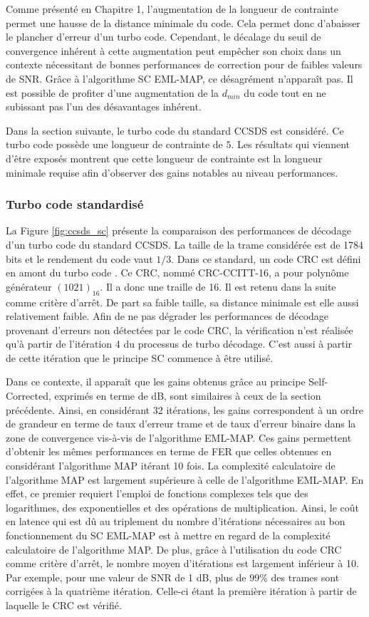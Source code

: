 Comme présenté en Chapitre 1, l'augmentation de la longueur de contrainte permet une hausse de la distance minimale du code.
Cela permet donc d'abaisser le plancher d'erreur d'un turbo code. Cependant, le décalage du seuil de 
convergence inhérent à cette augmentation peut empêcher son choix dans un contexte nécessitant de bonnes performances de 
correction pour de faibles valeurs de SNR. Grâce 
à l’algorithme SC EML-MAP, ce désagrément n’apparaît pas. Il est possible de profiter d'une augmentation de la 
$d_{min}$ du code tout en ne subissant pas l'un des désavantages inhérent.

Dans la section suivante, le turbo code du standard CCSDS est considéré. Ce turbo code possède une longueur de 
contrainte de $5$. Les résultats qui viennent d'être exposés montrent que cette longueur de contrainte est la 
longueur minimale requise afin d'observer des gains notables au niveau performances. 

\subsubsection{Turbo code standardisé}
La Figure \ref{fig:ccsds_sc} présente la comparaison des performances de décodage d'un turbo code du standard CCSDS. 
La taille de la trame considérée est de 1784 bits et le rendement du code vaut $1/3$. Dans ce standard, un code CRC est 
défini en amont du turbo code \cite{ccsdsBluebook}. Ce CRC, nommé CRC-CCITT-16, a pour polynôme générateur $(1021)_{16}$. 
Il a donc une traille de 16. Il est retenu dans la suite comme critère d'arrêt. De part sa faible taille, sa distance 
minimale est elle aussi relativement faible. Afin de ne pas dégrader les performances de décodage provenant d'erreurs 
non détectées par le code CRC, la vérification n'est réalisée qu'à partir de l'itération 4 du processus de turbo décodage.
C'est aussi à partir de cette itération que le principe SC commence à être utilisé.

Dans ce contexte, il apparaît que les gains obtenus grâce au principe Self-Corrected, exprimés en terme de dB, sont similaires à ceux de la 
section précédente. Ainsi, en considérant 32 itérations, les gains correspondent à un ordre de grandeur en 
terme de taux d'erreur trame et de taux d'erreur binaire dans la zone de convergence vis-à-vis de l'algorithme EML-MAP. 
Ces gains permettent d'obtenir les mêmes performances en terme de FER que celles obtenues en considérant l'algorithme 
MAP itérant 10 fois. La complexité calculatoire de l’algorithme MAP 
est largement supérieure à celle de l'algorithme EML-MAP. En effet, ce premier requiert l’emploi de fonctions complexes 
tels que des logarithmes, des exponentielles et des opérations de multiplication. Ainsi, le coût en latence qui est dû 
au triplement du nombre d'itérations nécessaires au bon fonctionnement du SC 
EML-MAP est à mettre en regard de la complexité calculatoire de l'algorithme MAP. 
De plus, grâce à l'utilisation du code CRC comme critère d'arrêt, le nombre moyen d'itérations est largement inférieur à 10. 
Par exemple, pour une valeur de SNR de 1 dB, plus de $99\%$ des trames sont corrigées à la quatrième itération. Celle-ci étant la première 
itération à partir de laquelle le CRC est vérifié. 


